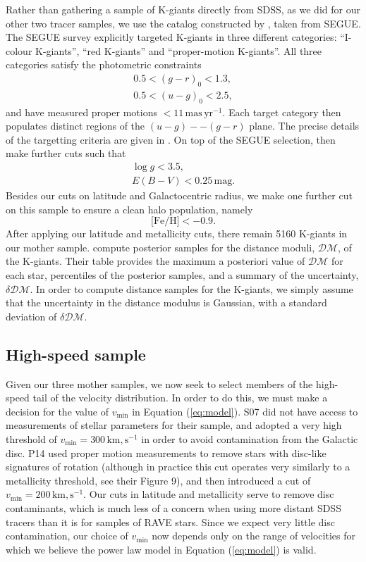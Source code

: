\documentclass[useAMS,twocolumn,usenatbib]{mn2e}
\def\km,s{{\,\mathrm{km,s^{-1}}}}
\begin{document}
Rather than gathering a sample of K-giants directly from SDSS, as we did for our other two tracer samples, we use the catalog constructed by \cite{Xu14}, taken from SEGUE. 
The SEGUE survey \citep{Ya09} explicitly targeted K-giants in three different categories: ``I-colour K-giants'', ``red K-giants'' and ``proper-motion K-giants''. 
All three categories satisfy the photometric constraints
%
\begin{gather}
0.5 < (g-r)_0 < 1.3, \nonumber \\
0.5 < (u-g)_0 < 2.5,
\end{gather}
%
and have measured proper motions $<11 \,\mathrm{mas\,yr^{-1}}$. 
Each target category then populates distinct regions of the $(u-g)--(g-r)$ plane. 
The precise details of the targetting criteria are given in \cite{Ya09}. On top of the SEGUE selection, \citeauthor{Xu14} then make further cuts such that
%
\begin{gather}
\log g < 3.5, \nonumber \\
E(B-V) < 0.25 \,\mathrm{mag}. \nonumber
\end{gather}
%
Besides our cuts on latitude and Galactocentric radius, we make one further cut on this sample to ensure a clean halo population, namely
%
\begin{equation}
\lbrack \mathrm{Fe/H} \rbrack < -0.9.
\end{equation}
%
After applying our latitude and metallicity cuts, there remain 5160 K-giants in our mother sample. 
\citeauthor{Xu14} compute posterior samples for the distance moduli, $\mathcal{DM}$, of the K-giants. 
Their table provides the maximum a posteriori value of $\mathcal{DM}$ for each star, percentiles of the posterior samples, and a summary of the uncertainty, $\delta \mathcal{DM}$. 
In order to compute distance samples for the K-giants, we simply assume that the uncertainty in the distance modulus is Gaussian, with a standard deviation of $\delta\mathcal{DM}$.

\subsection{High-speed sample}

Given our three mother samples, we now seek to select members of the high-speed tail of the velocity distribution. 
In order to do this, we must make a decision for the value of $v_\mathrm{min}$ in Equation (\ref{eq:model}). 
S07 did not have access to measurements of stellar parameters for their sample, and adopted a very high threshold of $v_\mathrm{min} = 300\km,s$ in order to avoid contamination from the Galactic disc. 
P14 used proper motion measurements to remove stars with disc-like signatures of rotation (although in practice this cut operates very similarly to a metallicity threshold, see their Figure 9), and then introduced a cut of $v_\mathrm{min}=200\km,s$. 
Our cuts in latitude and metallicity serve to remove disc contaminants, which is much less of a concern when using more distant SDSS tracers than it is for samples of RAVE stars. 
Since we expect very little disc contamination, our choice of $v_\mathrm{min}$ now depends only on the range of velocities for which we believe the power law model in Equation (\ref{eq:model}) is valid.
\end{document}
